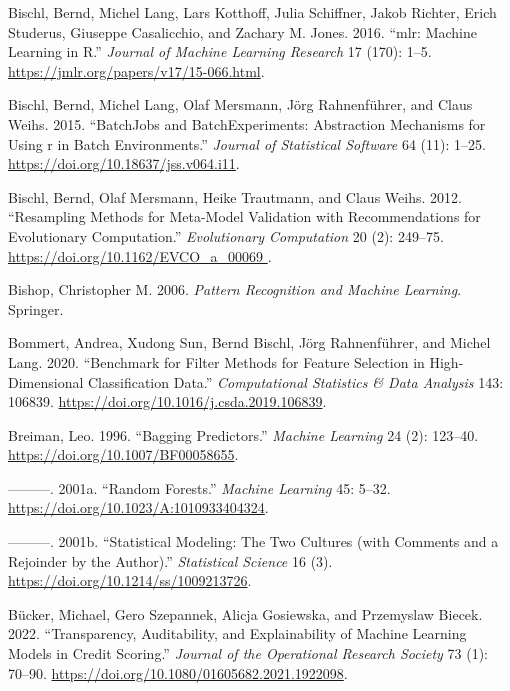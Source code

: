 \begin{CSLReferences}{1}{0}
\leavevmode{}%
Bischl, Bernd, Michel Lang, Lars Kotthoff, Julia Schiffner, Jakob
Richter, Erich Studerus, Giuseppe Casalicchio, and Zachary M. Jones.
2016. {``{mlr}: {M}achine {L}earning in {R}.''} \emph{Journal of Machine
Learning Research} 17 (170): 1--5.
\url{https://jmlr.org/papers/v17/15-066.html}.

\leavevmode{}%
Bischl, Bernd, Michel Lang, Olaf Mersmann, Jörg Rahnenführer, and Claus
Weihs. 2015. {``BatchJobs and BatchExperiments: Abstraction Mechanisms
for Using r in Batch Environments.''} \emph{Journal of Statistical
Software} 64 (11): 1--25. \url{https://doi.org/10.18637/jss.v064.i11}.

\leavevmode{}%
Bischl, Bernd, Olaf Mersmann, Heike Trautmann, and Claus Weihs. 2012.
{``Resampling Methods for Meta-Model Validation with Recommendations for
Evolutionary Computation.''} \emph{Evolutionary Computation} 20 (2):
249--75.
\href{https://doi.org/10.1162/EVCO_a_00069\%20}{https://doi.org/10.1162/EVCO\_a\_00069
}.

\leavevmode{}%
Bishop, Christopher M. 2006. \emph{Pattern Recognition and Machine
Learning}. Springer.

\leavevmode{}%
Bommert, Andrea, Xudong Sun, Bernd Bischl, Jörg Rahnenführer, and Michel
Lang. 2020. {``Benchmark for Filter Methods for Feature Selection in
High-Dimensional Classification Data.''} \emph{Computational Statistics
\& Data Analysis} 143: 106839.
\url{https://doi.org/10.1016/j.csda.2019.106839}.

\leavevmode{}%
Breiman, Leo. 1996. {``Bagging Predictors.''} \emph{Machine Learning} 24
(2): 123--40. \url{https://doi.org/10.1007/BF00058655}.

\leavevmode{}%
---------. 2001a. {``Random Forests.''} \emph{Machine Learning} 45:
5--32. \url{https://doi.org/10.1023/A:1010933404324}.

\leavevmode{}%
---------. 2001b. {``Statistical Modeling: The Two Cultures (with
Comments and a Rejoinder by the Author).''} \emph{Statistical Science}
16 (3). \url{https://doi.org/10.1214/ss/1009213726}.

\leavevmode{}%
Bücker, Michael, Gero Szepannek, Alicja Gosiewska, and Przemyslaw
Biecek. 2022. {``Transparency, Auditability, and Explainability of
Machine Learning Models in Credit Scoring.''} \emph{Journal of the
Operational Research Society} 73 (1): 70--90.
\url{https://doi.org/10.1080/01605682.2021.1922098}.


\end{CSLReferences}
